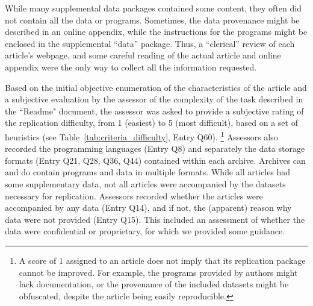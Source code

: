 While many supplemental data packages contained some content, they often did not contain all the data or programs. Sometimes, the data provenance might be described in an online appendix, while the instructions for the programs might be enclosed in the supplemental ``data'' package. Thus, a ``clerical'' review of each article's webpage, and some careful reading of the actual article and online appendix were the only way to collect all the information requested. 

Based on the initial objective enumeration of the characteristics of the article and a subjective evaluation by the assessor of the complexity of the task described in the ``Readme" document, the assessor was asked to provide a subjective rating of the replication difficulty, from 1 (easiest) to 5 (most difficult), based on a set of heuristics (see Table~\ref{tab:criteria_difficulty}, Entry Q60).%
\footnote{A score of 1 assigned to an article does not imply that its replication package cannot be improved. For example, the programs provided by authors might lack documentation, or the provenance of the included datasets might be obfuscated, despite  the article being easily reproducible.}
Assessors also recorded the programming languages (Entry Q8) and separately the data storage formats (Entry Q21, Q28, Q36, Q44) contained within each archive. Archives can and do contain programs and data in multiple formats.
While all articles had some supplementary data, not all articles were accompanied by the datasets necessary for replication. Assessors recorded  whether the articles were accompanied by any data (Entry Q14), and if not, the (apparent) reason why data were not provided (Entry Q15). This included an assessment of whether the data were confidential or proprietary, for which we provided some guidance.



